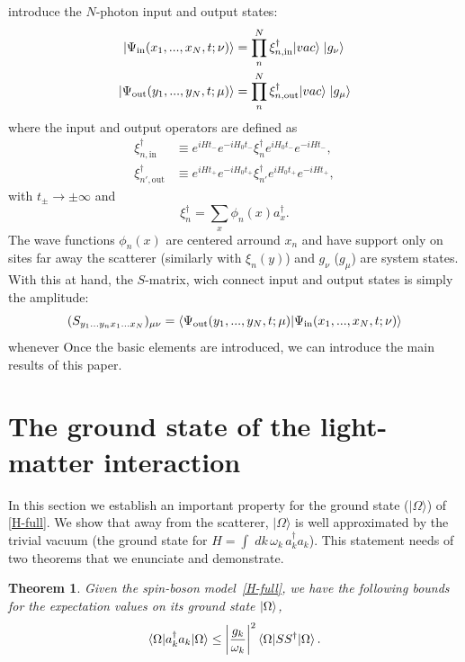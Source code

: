\documentclass[notitlepage, prx, preprint, amsmath,superscriptaddress,amssymb]{revtex4-1}
\newtheorem{theorem}{Theorem}[section]
\begin{document}
 introduce the $N$-photon  input and output states:
\begin{align}
| \Psi_{\rm in} (x_1, ..., x_N, t; \nu) \rangle &= \prod_n^N  \xi^\dagger_{n, \text{in}} |vac \rangle  \; |g_\nu \rangle
\\
| \Psi_{\rm out} (y_1, ..., y_N, t; \mu) \rangle &= \prod_{n}^N \xi^\dagger_{n, \text{out}} |vac \rangle  \; |g_\mu \rangle
\end{align} 
where the input and output operators are defined as
\begin{align}
\xi_{n,\text{in}}^\dagger & \equiv e^{iHt_-} e^{-iH_0t_-}\xi_n^\dagger e^{iH_0 t_-} e^{-iHt_-},\\
\xi_{n',\text{out}}^\dagger & \equiv e^{iHt_+} e^{-iH_0t_+}\xi_{n'}^\dagger e^{iH_0 t_+} e^{-iHt_+},
\end{align}
with $t_\pm \to\pm\infty$ and
\begin{equation}
\xi_n^\dagger = \sum_x  \phi_n(x) a_x^\dagger.
\end{equation}
The wave functions $\phi_n(x)$ are centered arround $x_n$ and  have support only on sites far away the scatterer (similarly with $\xi_n (y)$) and  $g_\nu$  ($g_\mu$) are system states.  With this at hand, the $S$-matrix, wich connect input and output states is simply the amplitude:
\begin{equation}
( S_{y_1 ...y_n x_1...x_N} )_{\mu \nu} =  \langle \Psi_{\rm out} (y_1, ..., y_N, t; \mu) | \Psi_{\rm in} (x_1, ..., x_N, t; \nu) \rangle
\end{equation}
whenever 
Once the basic elements are introduced, we can introduce the main results of this paper.  



\section{The ground state of the light-matter interaction}


In this section we establish an important property for the ground state ($|\Omega\rangle$)   of \eqref{H-full}.  We show that  away from the scatterer,  $|\Omega\rangle$ is well approximated by the trivial vacuum  (the ground state for $H= \int \; dk \, \omega_k \, a_k^\dagger a_k$).  This statement needs of two theorems that we enunciate and demonstrate.


\begin{theorem}
\label{th:bound-a}
Given the spin-boson model\ \eqref{H-full}, we have the following bounds for the expectation values on its ground state $\ket{\Omega}$,
\begin{equation}
\label{bound-nk}
\braket{\Omega|a_k^{\dagger}a_k|\Omega} \leq \left|\frac{g_k}{\omega_k}\right|^{2}
\braket{\Omega|S S^\dagger |\Omega} .
\end{equation}
\end{theorem}
\end{document}

